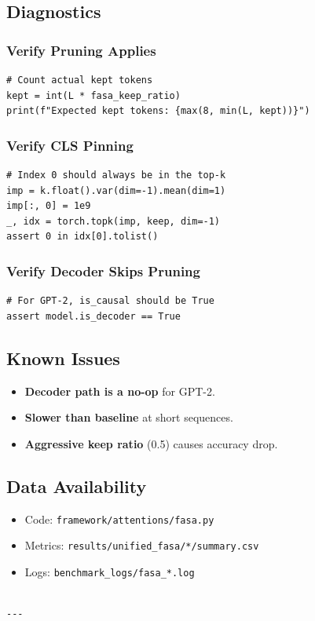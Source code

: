 \subsection{Diagnostics}

\subsubsection{Verify Pruning Applies}

\begin{lstlisting}
# Count actual kept tokens
kept = int(L * fasa_keep_ratio)
print(f"Expected kept tokens: {max(8, min(L, kept))}")
\end{lstlisting}

\subsubsection{Verify CLS Pinning}

\begin{lstlisting}
# Index 0 should always be in the top-k
imp = k.float().var(dim=-1).mean(dim=1)
imp[:, 0] = 1e9
_, idx = torch.topk(imp, keep, dim=-1)
assert 0 in idx[0].tolist()
\end{lstlisting}

\subsubsection{Verify Decoder Skips Pruning}

\begin{lstlisting}
# For GPT-2, is_causal should be True
assert model.is_decoder == True
\end{lstlisting}

\subsection{Known Issues}

\begin{itemize}
\item \textbf{Decoder path is a no-op} for GPT-2.
\item \textbf{Slower than baseline} at short sequences.
\item \textbf{Aggressive keep ratio} (0.5) causes accuracy drop.

\end{itemize}
\subsection{Data Availability}

\begin{itemize}
\item Code: \texttt{framework/attentions/fasa.py}
\item Metrics: \texttt{results/unified\_fasa/*/summary.csv}
\item Logs: \texttt{benchmark\_logs/fasa\_*.log}
\end{itemize}
\begin{lstlisting}

---
\end{lstlisting}